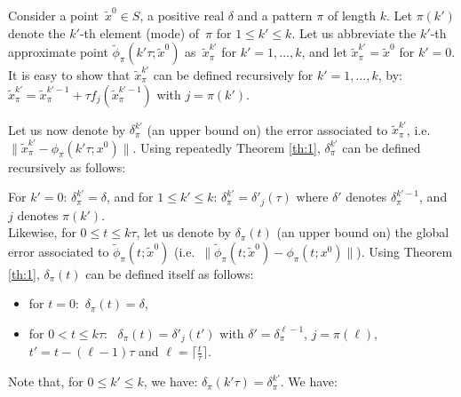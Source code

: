 Consider a point~$\tilde{x}^0\in S$, a positive real  $\delta$ %
and a pattern $\pi$ of length $k$.  
Let $\pi(k')$ denote the $k'$-th element (mode) of~$\pi$ for $1\leq k'\leq k$.
Let us abbreviate
the $k'$-th approximate point
$\tilde{\phi}_{\pi}(k'\tau;\tilde{x}^{0})$ 
as~$\tilde{x}_\pi^{k'}$ for $k'=1,...,k$, 
and let $\tilde{x}_\pi^{k'}=\tilde{x}^0$ for $k'=0$. It is easy to show that
$\tilde{x}_\pi^{k'}$ can be defined recursively for $k'=1,...,k$, by:
$\tilde{x}_\pi^{k'}=\tilde{x}_\pi^{k'-1}+\tau f_{j}(\tilde{x}_\pi^{k'-1})$
with $j=\pi(k')$.

Let us now
denote by  $\delta_\pi^{k'}$
(an upper bound on) the error associated to $\tilde{x}_\pi^{k'}$,
i.e. $\|\tilde{x}_\pi^{k'}- \phi_\pi(k'\tau;x^0)\|$.
Using repeatedly Theorem \ref{th:1},
$\delta_{\pi}^{k'}$ can be defined recursively
as follows:

For $k'=0$: $\delta_{\pi}^{k'}=\delta$,
and for $1\leq k'\leq k$: $\delta^{k'}_{\pi}=\delta'_j(\tau)$
where $\delta'$ denotes $\delta^{k'-1}_{\pi}$, and $j$ denotes
$\pi(k')$.\\
Likewise, for $0\leq t\leq k\tau$, let us
denote by $\delta_{\pi}(t)$
(an upper bound on) the 
global error associated to $\tilde{\phi}_\pi(t;\tilde{x}^0)$
(i.e.~$\|\tilde{\phi}_\pi(t;\tilde{x}^0)- \phi_\pi(t;x^0)\|$).
Using Theorem \ref{th:1},
$\delta_{\pi}(t)$ can be defined itself as follows:
\begin{itemize}
\item for $t=0$:\ $\delta_\pi(t)=\delta$,
\item for $0<t\leq k\tau$:\ 
%
$\delta_{\pi}(t)=\delta'_{j}(t')$ with 
$\delta'=\delta_\pi^{\ell-1}$, $j=\pi(\ell)$,
$t'=t-(\ell-1)\tau$ and
$\ell=\lceil \frac{t}{\tau}\rceil$.
%
\end{itemize}
Note that, for $0\leq k'\leq k$, we have: 
$\delta_{\pi}(k'\tau)=\delta_\pi^{k'}$. We have:

